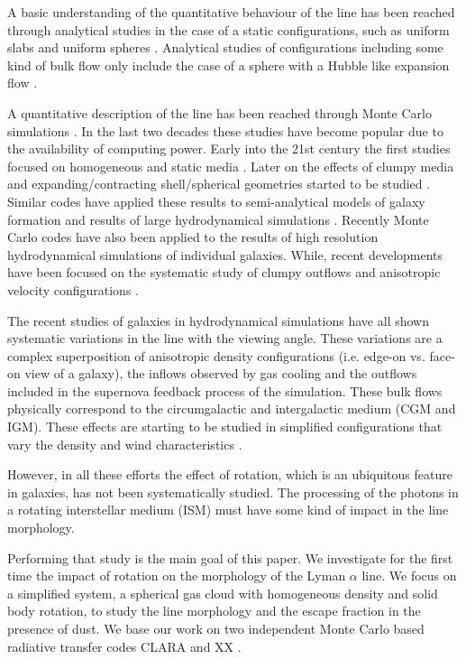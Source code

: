 \documentclass{emulateapj}
\newcommand{\ly}{{\ifmmode{{\rm Ly}\alpha~}\else{Ly$\alpha$~}\fi}}
\begin{document}
A basic understanding of the quantitative behaviour of the \ly line
has been reached through analytical studies in the case of a static
configurations, such as uniform slabs
\citep{Harrington73,Neufeld90} and  uniform spheres
\citep{Dijkstra06}. Analytical studies of configurations including
some kind of bulk flow only include the case of a sphere with a Hubble
like expansion flow \citep{LoebRybicki}. 

A quantitative description of the \ly line has been reached through
Monte Carlo simulations \citep{Auer68,Avery68,Adams72}. In the last
two decades these studies have become popular due to the
availability of computing power. Early into the 21st century the first
studies focused on homogeneous and static media
\citep{Ahn00,Ahn01,Zheng02}. Later on the effects of clumpy media
\citep{Hansen06} and expanding/contracting shell/spherical geometries started to
be studied \citep{Verhamme06,Dijkstra06}. Similar codes have applied
these results to semi-analytical models of galaxy formation \citep{Orsi12} and
results of large hydrodynamical simulations
\citep{CLARA,Forero12,Behrens13}. Recently Monte Carlo codes have also
been applied to the results of high resolution hydrodynamical
simulations of individual
galaxies\citep{Laursen09,Barnes11,Verhamme12,Yajima12}. While, recent
developments have been focused on the systematic study of clumpy
outflows \citep{DijkstraKramer}and anisotropic velocity configurations
\citep{Zheng2013}. 

The recent studies of galaxies in hydrodynamical simulations
\citep{Laursen09,Barnes11,Verhamme12,Yajima12} have all shown
systematic variations in the \ly line with the viewing angle. These
variations are a complex superposition of anisotropic density
configurations (i.e. edge-on vs. face-on view of a galaxy), the
inflows observed by gas cooling and the outflows included in the
supernova feedback process of the simulation. These bulk flows
physically correspond to the circumgalactic and intergalactic medium
(CGM and IGM). These effects are starting to be studied
 in simplified configurations that vary the density and wind
 characteristics \citep{Zheng2013}. 

However, in all these efforts the effect of rotation,
which is an ubiquitous feature in galaxies, has not been
systematically studied. The processing of the \ly photons in a
rotating interstellar medium (ISM) must have some kind of impact in
the \ly line morphology. 

Performing that study is the main goal of this paper. We investigate for the
first time the impact of rotation on the morphology of the Lyman
$\alpha$ line. We focus on a simplified system, a spherical gas cloud
with homogeneous density and solid body rotation, to study the line
morphology and the escape  fraction in the presence of dust. We base
our work on two independent Monte Carlo based radiative transfer codes
CLARA \citep{CLARA} and XX \citep{DijkstraKramer} .   
  
\end{document}
